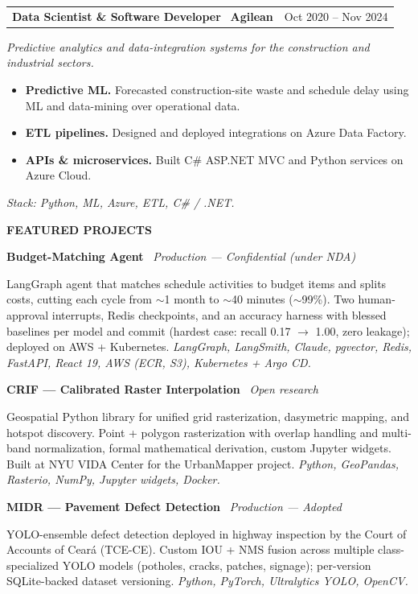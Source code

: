 \documentclass[10pt,a4paper]{article}
\makeatletter
\renewcommand{\section}[1]{%
  \par\vspace{10pt}%
  {\large\bfseries\color{accent}\MakeUppercase{#1}}\par%
  \vspace{2pt}%
  \noindent{\color{rule}\rule{\linewidth}{0.6pt}}\par%
  \vspace{2pt}%
}
\newcommand{\job}[3]{%
  \par\vspace{4pt}%
  \noindent\begin{tabularx}{\linewidth}{@{}X r@{}}%
    \textbf{#1} \, {\color{accent}\textbf{#2}} & {\small\color{muted}#3} \\
  \end{tabularx}%
  \vspace{1pt}%
}
\newcommand{\project}[2]{%
  \par\vspace{3pt}%
  \noindent\textbf{#1} \, {\small\color{muted}\textit{#2}}\par%
}
\makeatother
\begin{document}
\job{Data Scientist \& Software Developer}{Agilean}{Oct 2020 -- Nov 2024}
\textit{\small Predictive analytics and data-integration systems for the construction and industrial sectors.}
\begin{itemize}
  \item \textbf{Predictive ML.} Forecasted construction-site waste and schedule delay using ML and data-mining over operational data.
  \item \textbf{ETL pipelines.} Designed and deployed integrations on Azure Data Factory.
  \item \textbf{APIs \& microservices.} Built C\# ASP.NET MVC and Python services on Azure Cloud.
\end{itemize}
\textit{\small Stack: Python, ML, Azure, ETL, C\# / .NET.}

\section{Featured Projects}

\project{Budget-Matching Agent}{Production --- Confidential (under NDA)}
LangGraph agent that matches schedule activities to budget items and splits costs, cutting each cycle from $\sim$1 month to $\sim$40 minutes ($\sim$99\%). Two human-approval interrupts, Redis checkpoints, and an accuracy harness with blessed baselines per model and commit (hardest case: recall 0.17 $\rightarrow$ 1.00, zero leakage); deployed on AWS + Kubernetes. \textit{\small LangGraph, LangSmith, Claude, pgvector, Redis, FastAPI, React 19, AWS (ECR, S3), Kubernetes + Argo CD.}

\project{CRIF --- Calibrated Raster Interpolation}{Open research}
Geospatial Python library for unified grid rasterization, dasymetric mapping, and hotspot discovery. Point + polygon rasterization with overlap handling and multi-band normalization, formal mathematical derivation, custom Jupyter widgets. Built at NYU VIDA Center for the UrbanMapper project. \textit{\small Python, GeoPandas, Rasterio, NumPy, Jupyter widgets, Docker.}

\project{MIDR --- Pavement Defect Detection}{Production --- Adopted}
YOLO-ensemble defect detection deployed in highway inspection by the Court of Accounts of Cear\'a (TCE-CE). Custom IOU + NMS fusion across multiple class-specialized YOLO models (potholes, cracks, patches, signage); per-version SQLite-backed dataset versioning. \textit{\small Python, PyTorch, Ultralytics YOLO, OpenCV.}
\end{document}
